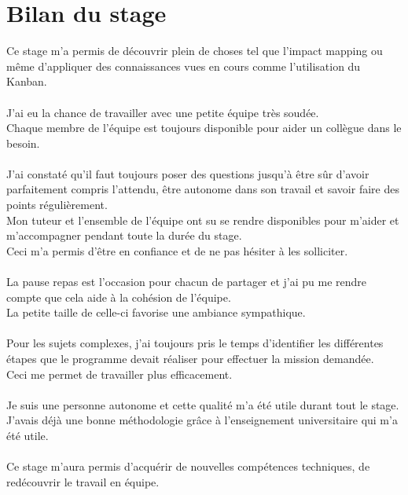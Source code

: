 \documentclass[a4paper,twoside,12pt]{report}
\begin{document}
\chapter{Bilan du stage}
Ce stage m’a permis de découvrir plein de choses tel que l'impact mapping ou même d'appliquer des connaissances vues en cours comme l'utilisation du Kanban.\\\\
J'ai eu la chance de travailler avec une petite équipe très soudée.\\
Chaque membre de l'équipe est toujours disponible pour aider un collègue dans le besoin.\\\\
J’ai constaté qu’il faut toujours poser des questions jusqu'à être sûr d'avoir parfaitement compris l'attendu, être autonome dans son travail et savoir faire des points régulièrement.\\
Mon tuteur et l'ensemble de l'équipe ont su se rendre disponibles pour m'aider et m'accompagner pendant toute la durée du stage.\\
Ceci m'a permis d'être en confiance et de ne pas hésiter à les solliciter.\\\\
La pause repas est l'occasion pour chacun de partager et j'ai pu me rendre compte que cela aide à la cohésion de l'équipe.\\
La petite taille de celle-ci favorise une ambiance sympathique.\\\\
Pour les sujets complexes, j'ai toujours pris le temps d'identifier les différentes étapes que le programme devait réaliser pour effectuer la mission demandée.\\
Ceci me permet de travailler plus efficacement.\\\\
Je suis une personne autonome et cette qualité m'a été utile durant tout le stage.\\
J'avais déjà une bonne méthodologie grâce à l'enseignement universitaire qui m'a été utile.\\\\
Ce stage m'aura permis d'acquérir de nouvelles compétences techniques, de redécouvrir le travail en équipe.
\end{document}
